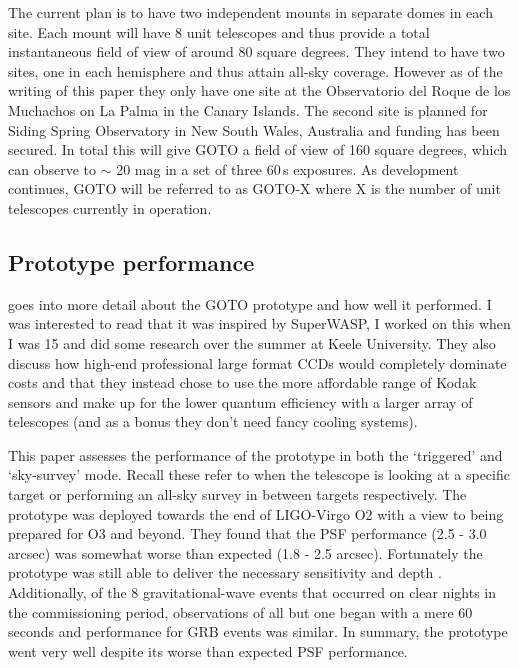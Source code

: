 \documentclass[twocolumn]{aastex631}
\begin{document}
The current plan is to have two independent mounts in separate domes in each site. Each mount will have 8 unit telescopes and thus provide a total instantaneous field of view of around 80 square degrees. They intend to have two sites, one in each hemisphere and thus attain all-sky coverage. However as of the writing of this paper they only have one site at the Observatorio del Roque de los Muchachos on La Palma in the Canary Islands. The second site is planned for Siding Spring Observatory in New South Wales, Australia and funding has been secured. In total this will give GOTO a field of view of 160 square degrees, which can observe to $\sim$ 20 mag in a set of three 60\,s exposures. As development continues, GOTO will be referred to as GOTO-X where X is the number of unit telescopes currently in operation.

\subsection{Prototype performance}
\citet{Steeghs+2022} goes into more detail about the GOTO prototype and how well it performed. I was interested to read that it was inspired by SuperWASP, I worked on this when I was 15 and did some research over the summer at Keele University. They also discuss how high-end professional large format CCDs would completely dominate costs and that they instead chose to use the more affordable range of Kodak sensors and make up for the lower quantum efficiency with a larger array of telescopes (and as a bonus they don't need fancy cooling systems).

This paper assesses the performance of the prototype in both the `triggered' and `sky-survey' mode. Recall these refer to when the telescope is looking at a specific target or performing an all-sky survey in between targets respectively. The prototype was deployed towards the end of LIGO-Virgo O2 with a view to being prepared for O3 and beyond. They found that the PSF performance (2.5 - 3.0 arcsec) was somewhat worse than expected (1.8 - 2.5 arcsec). Fortunately the prototype was still able to deliver the necessary sensitivity and depth \citep[see][Fig.~9]{Steeghs+2022}. Additionally, of the 8 gravitational-wave events that occurred on clear nights in the commissioning period, observations of all but one began with a mere 60 seconds and performance for GRB events was similar. In summary, the prototype went very well despite its worse than expected PSF performance.
\end{document}
